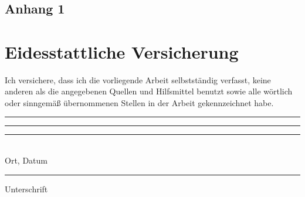 \documentclass[a4paper,12pt]{report}
\begin{document}


%

\appendix
\chapter[Anhang]{}
\newpage
\section{Anhang 1}

\chapter*{Eidesstattliche Versicherung} %
Ich versichere, dass ich die vorliegende Arbeit selbstständig verfasst, keine anderen als die angegebenen Quellen und Hilfsmittel benutzt sowie alle wörtlich oder sinngemäß übernommenen Stellen in der Arbeit gekennzeichnet habe.
\\[2cm]
\noindent\rule{0.35\textwidth}{0.3pt}\rule{0.2\textwidth}{0pt}\rule{0.45\textwidth}{0.3pt}
\\Ort, Datum\rule{0.418\textwidth}{0pt}Unterschrift
\end{document}
